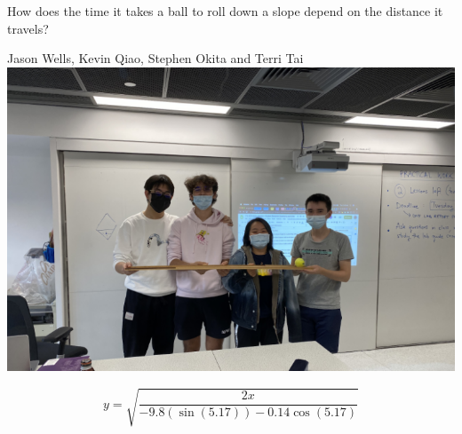 \documentclass[12pt]{report}
\begin{document}
\begin{center}
    {\huge How does the time it takes a ball to roll down a slope depend on the distance it travels?}
    
    \vspace{1cm}
    {\large Jason Wells, Kevin Qiao, Stephen Okita and Terri Tai}
    \vspace{2cm}
    \includegraphics[width=\textwidth]{Img.png}

\end{center}

\[ y = \sqrt{\frac{2x}{-9.8(\sin(5.17))-0.14\cos(5.17)}}\]
\end{document}
